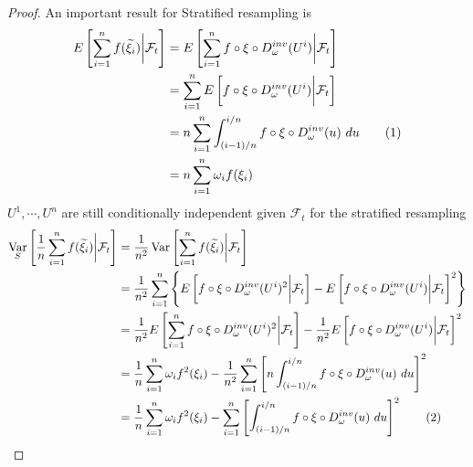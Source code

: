 \documentclass[11pt,a4,twosided,singlespacing,titlepagenumber=on]{scrreprt}
\numberwithin{equation}{chapter} %
\theoremstyle{remark}
\DeclareMathOperator{\var}{Var}
\newcommand\numberthis{\addtocounter{equation}{1}\tag{\theequation}}
\begin{document}
\begin{proof}
An important result for Stratified resampling is
\begin{align*}
E \left[ \sum_{i=1}^n f(\widetilde{\xi_i})  \bigg| \mathcal{F}_t \right] &= E \left[ \sum_{i=1}^n f \circ \xi \circ D_\omega^{inv}(U^i) \bigg| \mathcal{F}_t \right] \\
																  &= \sum_{i=1}^n E \left[ f \circ \xi \circ D_\omega^{inv}(U^i) \bigg| \mathcal{F}_t \right] \\
																  &= n \sum_{i=1}^n \int_{(i-1)/n}^{i/n} f \circ \xi \circ D_\omega^{inv}(u)\text{ }du \numberthis \\
																  &= n \sum_{i=1}^n \omega_i f(\xi_i)
\end{align*}
$U^1,\cdots,U^n$ are still conditionally independent given $\mathcal{F}_t$ for the stratified resampling
\begin{align*}
\var_S \left[ \frac{1}{n} \sum_{i=1}^n f(\widetilde{\xi_i}) \bigg| \mathcal{F}_t \right] &= \frac{1}{n^2} \var \left[ \sum_{i=1}^n f(\widetilde{\xi_i}) \bigg| \mathcal{F}_t \right] \\
																					  &= \frac{1}{n^2} \sum_{i=1}^n \left\{ E \left[ f \circ \xi \circ D_\omega^{inv}(U^i)^2 \bigg| \mathcal{F}_t \right] - E \left[ f \circ \xi \circ D_\omega^{inv}(U^i) \bigg| \mathcal{F}_t \right]^2 \right\}\\
																					  &= \frac{1}{n^2} E \left[ \sum_{i=1}^n f \circ \xi \circ D_\omega^{inv}(U^i)^2 \bigg| \mathcal{F}_t \right] - \frac{1}{n^2} E \left[ f \circ \xi \circ D_\omega^{inv}(U^i) \bigg| \mathcal{F}_t \right]^2 \\
																					  &= \frac{1}{n} \sum_{i=1}^n \omega_i f^2(\xi_i) - \frac{1}{n^2} \sum_{i=1}^n \left[ n \int_{(i-1)/n}^{i/n} f \circ \xi \circ D_\omega^{inv}(u)\text{ }du\right]^2 \\
																					  &= \frac{1}{n} \sum_{i=1}^n \omega_i f^2(\xi_i) - \sum_{i=1}^n \left[ \int_{(i-1)/n}^{i/n} f \circ \xi \circ D_\omega^{inv}(u)\text{ }du\right]^2 \numberthis
\end{align*}


\end{proof}
\end{document}
